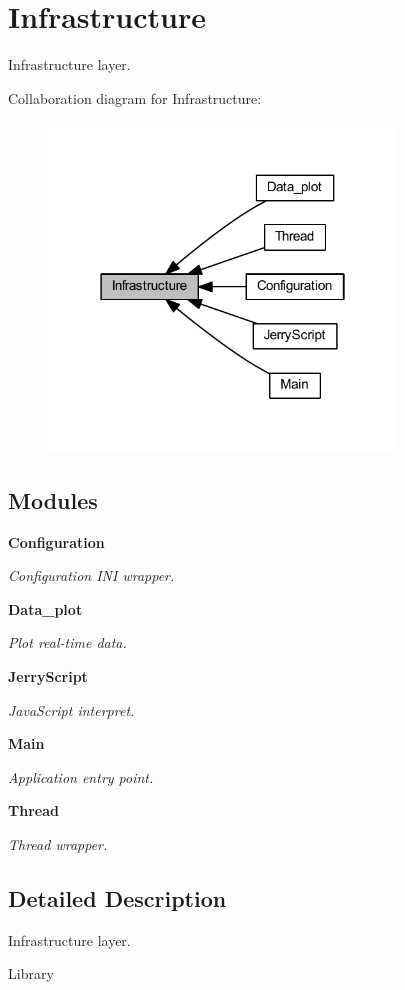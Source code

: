 \section{Infrastructure}
\label{group___infrastructure}


Infrastructure layer.  


Collaboration diagram for Infrastructure\+:
\nopagebreak
\begin{figure}[H]
\begin{center}
\leavevmode
\includegraphics[width=262pt]{group___infrastructure}
\end{center}
\end{figure}
\subsection*{Modules}
\begin{DoxyCompactItemize}
\item 
\textbf{ Configuration}
\begin{DoxyCompactList}\small\item\em Configuration I\+NI wrapper. \end{DoxyCompactList}\item 
\textbf{ Data\+\_\+plot}
\begin{DoxyCompactList}\small\item\em Plot real-\/time data. \end{DoxyCompactList}\item 
\textbf{ Jerry\+Script}
\begin{DoxyCompactList}\small\item\em Java\+Script interpret. \end{DoxyCompactList}\item 
\textbf{ Main}
\begin{DoxyCompactList}\small\item\em Application entry point. \end{DoxyCompactList}\item 
\textbf{ Thread}
\begin{DoxyCompactList}\small\item\em Thread wrapper. \end{DoxyCompactList}\end{DoxyCompactItemize}


\subsection{Detailed Description}
Infrastructure layer. 

Library 